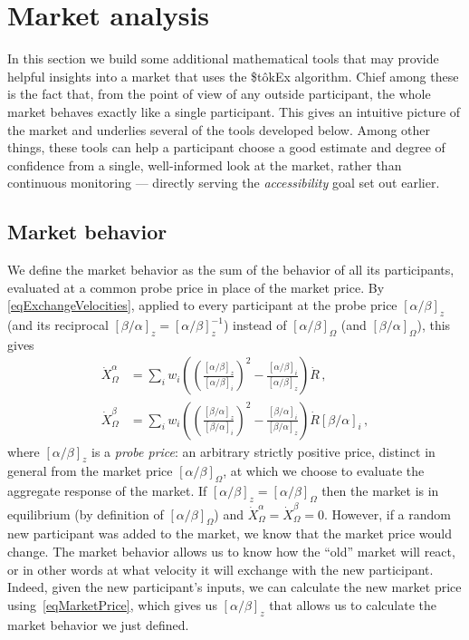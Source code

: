 \documentclass[letterpaper]{article}
\newcommand{\priceAB}{\left[\alpha / \beta\right]}
\newcommand{\priceBA}{\left[\beta / \alpha\right]}
\newcommand{\StokEx}{\$t\^{o}kEx}
\begin{document}
\clearpage

\section{Market analysis}

In this section we build some additional mathematical tools that may provide helpful insights into a market that uses the \StokEx{} algorithm.
Chief among these is the fact that, from the point of view of any outside participant, the whole market behaves exactly like a single participant.
This gives an intuitive picture of the market and underlies several of the tools developed below.
Among other things, these tools can help a participant choose a good estimate and degree of confidence from a single, well-informed look at the market, rather than continuous monitoring --- directly serving the \emph{accessibility} goal set out earlier.

\subsection{Market behavior}\label{secMarketBehavior}

We define the market behavior as the sum of the behavior of all its participants, evaluated at a common probe price in place of the market price. By \eqref{eqExchangeVelocities}, applied to every participant at the probe price $\priceAB_z$ (and its reciprocal $\priceBA_z = \priceAB_z^{-1}$) instead of $\priceAB_\Omega$ (and $\priceBA_\Omega$), this gives
\begin{align}
    \dot{X}_\Omega^\alpha &= \sum_i w_i \left( \left( \frac{\priceAB_z}{\priceAB_i}\right)^2 - \frac{\priceAB_i}{\priceAB_z} \right) \dot{R} \,, \nonumber\\
    \dot{X}_\Omega^\beta  &= \sum_i w_i \left( \left( \frac{\priceBA_z}{\priceBA_i}\right)^2 - \frac{\priceBA_i}{\priceBA_z} \right) \dot{R} \priceBA_i \,, \label{eqDefMarketBehavior}
\end{align}
where $\priceAB_z$ is a \emph{probe price}: an arbitrary strictly positive price, distinct in general from the market price $\priceAB_\Omega$, at which we choose to evaluate the aggregate response of the market. If $\priceAB_z = \priceAB_\Omega$ then the market is in equilibrium (by definition of $\priceAB_\Omega$) and $\dot{X}_\Omega^\alpha=\dot{X}_\Omega^\beta=0$. However, if a random new participant was added to the market, we know that the market price would change. The market behavior allows us to know how the ``old'' market will react, or in other words at what velocity it will exchange with the new participant. Indeed, given the new participant's inputs, we can calculate the new market price using~\eqref{eqMarketPrice}, which gives us $\priceAB_z$ that allows us to calculate the market behavior we just defined.
\end{document}
